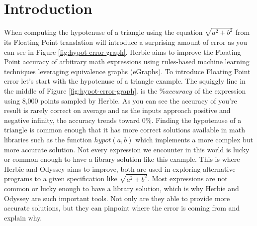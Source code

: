 \documentclass{article}
\begin{document}
\section{Introduction}
When computing the hypotenuse of a triangle using the equation $\sqrt{a^2 + b^2}$ from its Floating Point translation will introduce a surprising amount of error as you can see in Figure \ref{fig:hypot-error-graph}. Herbie aims to improve the Floating Point accuracy of arbitrary math expressions using rules-based machine learning techniques leveraging equivalence graphs (eGraphs). To introduce Floating Point error let's start with the hypotenuse of a triangle example. The squiggly line in the middle of Figure \ref{fig:hypot-error-graph}.  is the $\%accuracy$ of the expression using 8,000 points sampled by Herbie. As you can see the accuracy of you're result is rarely correct on average and as the inputs approach positive and negative infinity, the accuracy trends toward 0\%. Finding the hypotenuse of a triangle is common enough that it has more correct solutions available in math libraries such as the function $hypot(a,b)$ which implements a more complex but more accurate solution. Not every expression we encounter in this world is lucky or common enough to have a library solution like this example. This is where Herbie and Odyssey \cite{Odyssey} aims to improve, both are used in exploring alternative programs to a given specification like $\sqrt{a^2 + b^2}$. Most expressions are not common or lucky enough to have a library solution, which is why Herbie and Odyssey are such important tools. Not only are they able to provide more accurate solutions, but they can pinpoint where the error is coming from and explain why.
\end{document}
